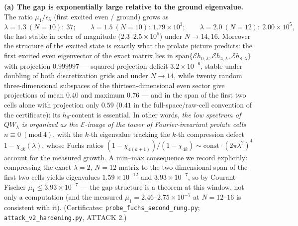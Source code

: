 \documentclass[
  letterpaper,
  11pt]{article}
\theoremstyle{plain}
\theoremstyle{definition}
\theoremstyle{remark}
\begin{document}
\textbf{(a) The gap is exponentially large relative to the ground eigenvalue.} The ratio \(\mu_1/\epsilon_\lambda\) (first excited even / ground) grows as
\[
\lambda = 1.3\ (N{=}10):\ 37; \qquad \lambda = 1.5\ (N{=}10):\ 1.79\times10^{3}; \qquad \lambda = 2.0\ (N{=}12):\ 2.00\times10^{5},
\]
the last stable in order of magnitude (\(2.3\)--\(2.5\times10^5\)) under \(N \to 14, 16\). Moreover the structure of the excited state is exactly what the prolate picture predicts: the first excited even eigenvector of the exact matrix lies in \(\mathrm{span}\{\mathcal E h_{0,\lambda}, \mathcal E h_{4,\lambda}, \mathcal E h_{8,\lambda}\}\) with projection \(0.999997\) --- squared-projection deficit \(3.2\times10^{-6}\), stable under doubling of both discretization grids and under \(N \to 14\), while twenty random three-dimensional subspaces of the thirteen-dimensional even sector give projections of mean \(0.40\) and maximum \(0.76\) --- and in the span of the first two cells alone with projection only \(0.59\) (\(0.41\) in the full-space/raw-cell convention of the certificate): its \(h_8\)-content is essential. In other words, \emph{the low spectrum of \(QW_\lambda\) is organized as the \(\mathcal E\)-image of the tower of Fourier-invariant prolate cells} \(n \equiv 0 \ (\mathrm{mod}\ 4)\), with the \(k\)-th eigenvalue tracking the \(k\)-th compression defect \(1-\chi_{4k}(\lambda)\), whose Fuchs ratios \((1-\chi_{4(k+1)})/(1-\chi_{4k}) \sim \mathrm{const}\cdot(2\pi\lambda^2)^4\) account for the measured growth. A min--max consequence we record explicitly: compressing the exact \(\lambda=2\), \(N=12\) matrix to the two-dimensional span of the first two cells yields eigenvalues \(1.59\times10^{-12}\) and \(3.93\times10^{-7}\), so by Courant--Fischer \(\mu_1 \le 3.93\times10^{-7}\) --- the gap structure is a theorem at this window, not only a computation (and the measured \(\mu_1 = 2.46\)--\(2.75\times10^{-7}\) at \(N = 12\)--\(16\) is consistent with it). (Certificates: \texttt{probe\_fuchs\_second\_rung.py}; \texttt{attack\_v2\_hardening.py}, ATTACK 2.)
\end{document}

